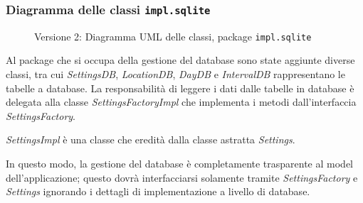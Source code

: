\subsubsection{Diagramma delle classi \texttt{impl.sqlite}}
\vspace{0.5cm}
\begin{figure}[H]
    \centering
    \caption{Versione 2: Diagramma UML delle classi, package \texttt{impl.sqlite}}
    \label{fig:class_db_v_2}
\end{figure}

Al package che si occupa della gestione del database sono state aggiunte diverse classi, tra cui \textit{SettingsDB}, \textit{LocationDB}, \textit{DayDB} e \textit{IntervalDB}
rappresentano le tabelle a database. La responsabilità di leggere i dati dalle tabelle in database è delegata alla classe \textit{SettingsFactoryImpl} che implementa i metodi dall'interfaccia \textit{SettingsFactory}.

\textit{SettingsImpl} è una classe che eredità dalla classe astratta \textit{Settings}.

In questo modo, la gestione del database è completamente trasparente al model dell'applicazione; questo dovrà interfacciarsi solamente tramite \textit{SettingsFactory} e \textit{Settings} ignorando i dettagli di implementazione a livello di database.